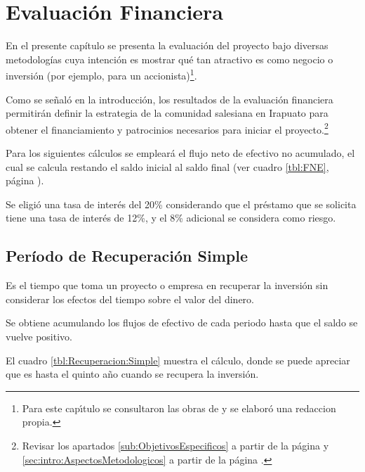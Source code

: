 \chapter{Evaluación Financiera}
\label{cap:Evaluacion:Financiera}

En el presente capítulo se presenta la evaluación del proyecto bajo diversas metodologías cuya intención es mostrar qué tan atractivo es como negocio o inversión (por ejemplo, para un accionista)\footnote{Para este cap\'{\i}tulo se consultaron las obras de \citep{Conant2004, COSS2000, SAPAG2007, Leland2006} y se elabor\'{o} una redaccion propia.}.


Como se señaló en la introducción, los resultados de la evaluación financiera permitirán definir la estrategia de la comunidad salesiana en Irapuato para obtener el financiamiento y patrocinios necesarios para iniciar el proyecto.\footnote{Revisar los apartados \ref{sub:ObjetivosEspecificos} a partir de la página \pageref{sub:ObjetivosEspecificos} y \ref{sec:intro:AspectosMetodologicos} a partir de la página \pageref{sec:intro:AspectosMetodologicos}.}

Para los siguientes cálculos se empleará el flujo neto de efectivo no acumulado, el cual se calcula restando el saldo inicial al saldo final (ver cuadro \ref{tbl:FNE}, página \pageref{tbl:FNE}).

Se eligió una tasa de interés del 20\% considerando que el préstamo que se solicita tiene una tasa de interés de 12\%, y el 8\% adicional se considera como riesgo.

\section{Período de Recuperación Simple}

Es el tiempo que toma un proyecto o empresa en recuperar la inversión sin considerar los efectos del tiempo sobre el valor del dinero.

Se obtiene acumulando los flujos de efectivo de cada periodo hasta que el saldo se vuelve positivo.

El cuadro \ref{tbl:Recuperacion:Simple} muestra el cálculo, donde se puede apreciar que es hasta el quinto año cuando se recupera la inversión.

